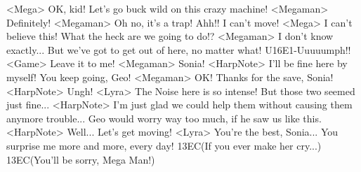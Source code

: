 <Mega> OK, kid! 
Let's go buck wild on this crazy machine! 
<Megaman> Definitely! 
<Megaman> Oh no, it's a trap! 
Ahh!! I can't move! 
<Mega> I can't believe this! 
What the heck are we going to do!? 
<Megaman> I don't know exactly... 
But we've got to get out of here, no matter what! 
U{16}{E1}-Uuuuumph!! 
<Game> Leave it to me! 
<Megaman> Sonia! 
<HarpNote> I'll be fine here by myself! 
You keep going, Geo! 
<Megaman> OK! 
Thanks for the save, Sonia! 
<HarpNote> Ungh! 
<Lyra> The Noise here is so intense! 
But those two seemed just fine... 
<HarpNote> I'm just glad we could help them without causing them anymore trouble... 
Geo would worry way too much, if he saw us like this. 
<HarpNote> Well... Let's get moving! 
<Lyra> You're the best, Sonia... 
You surprise me more and more, every day! 
{13}{EC}(If you ever make her cry...) 
{13}{EC}(You'll be sorry, Mega Man!) 
